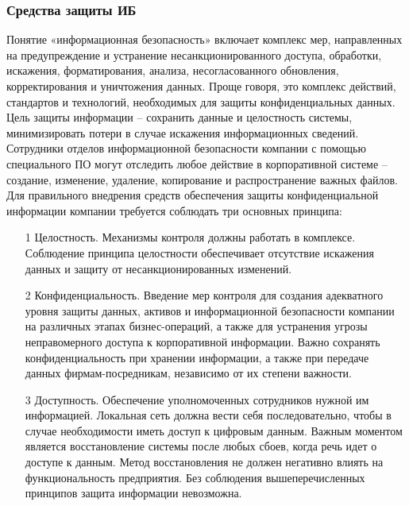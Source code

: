 \subsubsection{Средства защиты ИБ}
Понятие «информационная безопасность» включает комплекс мер, направленных на предупреждение и устранение несанкционированного доступа, обработки, искажения, форматирования, анализа, несогласованного обновления, корректирования и уничтожения данных. Проще говоря, это комплекс действий, стандартов и технологий, необходимых для защиты конфиденциальных данных.
Цель защиты информации – сохранить данные и целостность системы, минимизировать потери в случае искажения информационных сведений. Сотрудники отделов информационной безопасности компании с помощью специального ПО могут отследить любое действие в корпоративной системе – создание, изменение, удаление, копирование и распространение важных файлов.
Для правильного внедрения средств обеспечения защиты конфиденциальной информации компании требуется соблюдать три основных принципа:
\begin{enumerate}
    \item[1] Целостность. Механизмы контроля должны работать в комплексе. Соблюдение принципа целостности обеспечивает отсутствие искажения данных и защиту от несанкционированных изменений.
     \item[2] Конфиденциальность. Введение мер контроля для создания адекватного уровня защиты данных, активов и информационной безопасности компании на различных этапах бизнес-операций, а также для устранения угрозы неправомерного доступа к корпоративной информации. Важно сохранять конфиденциальность при хранении информации, а также при передаче данных фирмам-посредникам, независимо от их степени важности.
     \item[3] Доступность. Обеспечение уполномоченных сотрудников нужной им информацией. Локальная сеть должна вести себя последовательно, чтобы в случае необходимости иметь доступ к цифровым данным.  Важным моментом является восстановление системы после любых сбоев, когда речь идет о доступе к данным. Метод восстановления не должен негативно влиять на функциональность предприятия. Без соблюдения вышеперечисленных принципов защита информации невозможна.
\end{enumerate}

